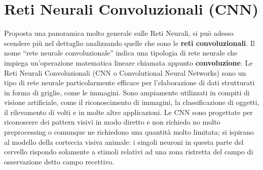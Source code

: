 \chapter{Reti Neurali Convoluzionali (CNN)}
Proposta una panoramica molto generale sulle Reti Neurali, si può adesso scendere più
nel dettaglio analizzando quelle che sono le \textbf{reti convoluzionali}.
Il nome “rete neurale convoluzionale” indica una tipologia di rete neurale che impiega 
un’operazione matematica lineare chiamata appunto \textbf{convoluzione}.
Le Reti Neurali Convoluzionali (CNN o Convolutional Neural Networks) sono un tipo di rete 
neurale particolarmente efficace per l'elaborazione di dati strutturati in forma di 
griglie, come le immagini. Sono ampiamente utilizzati in compiti di visione artificiale, 
come il riconoscimento di immagini, la classificazione di oggetti, il rilevamento di volti  
e in molte altre applicazioni.
Le CNN sono progettate per riconoscere dei pattern visivi in modo diretto e non richiedo
no molto preprocessing o comunque ne richiedono una quantità molto limitata; si ispirano 
al modello della corteccia visiva animale: i singoli neuroni in questa parte del cervello 
rispondo solamente a stimoli relativi ad una zona ristretta del campo di osservazione detto
campo recettivo.

